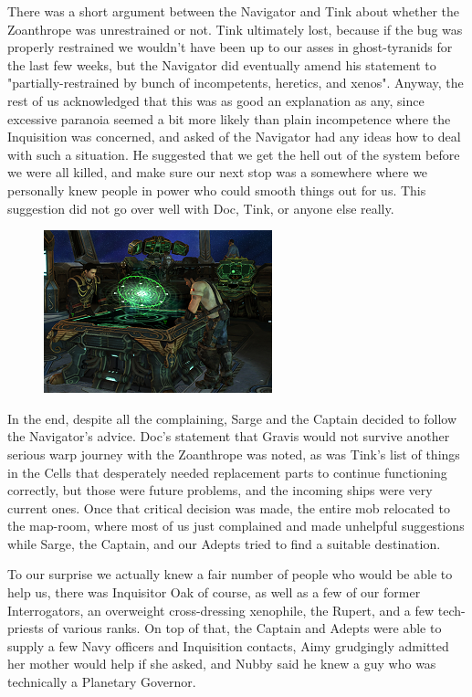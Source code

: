 There was a short argument between the Navigator and Tink about whether the Zoanthrope was unrestrained or not. 
Tink ultimately lost, because if the bug was properly restrained we wouldn't have been up to our asses in ghost-tyranids for the last few weeks, but the Navigator did eventually amend his statement to "partially-restrained by bunch of incompetents, heretics, and xenos". 
Anyway, the rest of us acknowledged that this was as good an explanation as any, since excessive paranoia seemed a bit more likely than plain incompetence where the Inquisition was concerned, and asked of the Navigator had any ideas how to deal with such a situation. 
He suggested that we get the hell out of the system before we were all killed, and make sure our next stop was a somewhere where we personally knew people in power who could smooth things out for us. 
This suggestion did not go over well with Doc, Tink, or anyone else really.

\begin{figure}
	\begin{center}
		\includegraphics[width=\figwidth]{pics/15/29.png}
	\end{center}
\end{figure}
In the end, despite all the complaining, Sarge and the Captain decided to follow the Navigator's advice. 
Doc's statement that Gravis would not survive another serious warp journey with the Zoanthrope was noted, as was Tink's list of things in the Cells that desperately needed replacement parts to continue functioning correctly, but those were future problems, and the incoming ships were very current ones. 
Once that critical decision was made, the entire mob relocated to the map-room, where most of us just complained and made unhelpful suggestions while Sarge, the Captain, and our Adepts tried to find a suitable destination.

To our surprise we actually knew a fair number of people who would be able to help us, there was Inquisitor Oak of course, as well as a few of our former Interrogators, an overweight cross-dressing xenophile, the Rupert, and a few tech-priests of various ranks. 
On top of that, the Captain and Adepts were able to supply a few Navy officers and Inquisition contacts, Aimy grudgingly admitted her mother would help if she asked, and Nubby said he knew a guy who was technically a Planetary Governor. 


